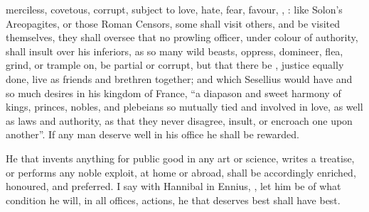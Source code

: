 merciless, covetous, corrupt, subject to love, hate, fear, favour, \etc{},
: like Solon's Areopagites, or those Roman
Censors, some shall visit others, and be visited
 themselves, they shall oversee that no
prowling officer, under colour of authority, shall insult over his inferiors,
as so many wild beasts, oppress, domineer, flea, grind, or trample on, be
partial or corrupt, but that there be , justice equally done,
live as friends and brethren together; and which Sesellius
would have and so much desires in his kingdom of France, \enquote{a diapason and sweet
harmony of kings, princes, nobles, and plebeians so mutually tied and involved
in love, as well as laws and authority, as that they never disagree, insult, or
encroach one upon another}. If any man deserve well in his office he shall be
rewarded.


He that invents anything for public good in any art or science, writes a
treatise, or performs any noble exploit, at home or abroad,
shall be accordingly enriched,
honoured, and preferred. I say with Hannibal in Ennius,
, let him be of what condition
he will, in all offices, actions, he that deserves best shall have best.

